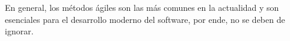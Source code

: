 \documentclass[12pt]{article}
\begin{document}
\vspace{\baselineskip}
En general, los métodos ágiles son las más comunes en la actualidad y son esenciales para el desarrollo moderno del software, por ende, no se deben de ignorar. \par


\vspace{\baselineskip}

\vspace{\baselineskip}

\vspace{\baselineskip}

\vspace{\baselineskip}

\vspace{\baselineskip}

\vspace{\baselineskip}

\vspace{\baselineskip}

\vspace{\baselineskip}

\vspace{\baselineskip}

\vspace{\baselineskip}

\vspace{\baselineskip}

\vspace{\baselineskip}

\vspace{\baselineskip}

\vspace{\baselineskip}

\vspace{\baselineskip}

\printbibliography
\end{document}
